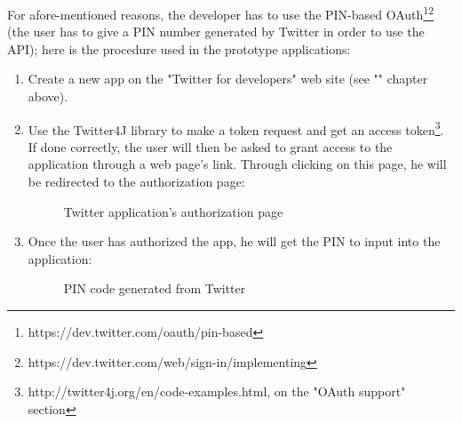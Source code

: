 \documentclass[a4paper,11pt]{report}
\begin{document}
For afore-mentioned reasons, the developer has to use the PIN-based OAuth\footnote{https://dev.twitter.com/oauth/pin-based}\footnote{https://dev.twitter.com/web/sign-in/implementing} (the user has to give a PIN number generated by Twitter in order to use the API); here is the procedure used in the prototype applications:
\begin{enumerate}
	\item Create a new app on the "Twitter for developers" web site (see "" chapter above).
	\item Use the Twitter4J library to make a token request and get an access token\footnote{http://twitter4j.org/en/code-examples.html, on the "OAuth support" section}.\\
	
	If done correctly, the user will then be asked to grant access to the application through a web page's link. Through clicking on this page, he will be redirected to the authorization page:
	\begin{figure}[H]
	\vspace{-5pt}
	\begin{center}
	\vspace{-5pt}
	\caption{Twitter application's authorization page}
	\end{center}
	\end{figure}
	\vspace{-20pt}
	
	\item Once the user has authorized the app, he will get the PIN to input into the application:
	\begin{figure}[H]
	\vspace{-5pt}
	\begin{center}
	\vspace{-5pt}
	\caption{PIN code generated from Twitter}
	\end{center}
	\end{figure}
	\vspace{-20pt}
	

\end{enumerate}
\end{document}
